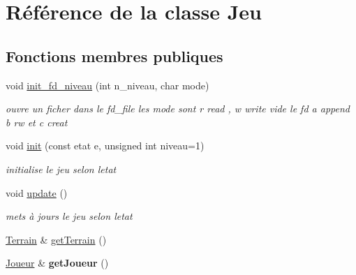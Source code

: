 \hypertarget{class_jeu}{}\section{Référence de la classe Jeu}
\label{class_jeu}
\subsection*{Fonctions membres publiques}
\begin{DoxyCompactItemize}
\item 
\mbox{\label{class_jeu_a5535a6630eb92c048a10ef791e71cf5a}} 
void \mbox{\hyperlink{class_jeu_a5535a6630eb92c048a10ef791e71cf5a}{init\+\_\+fd\+\_\+niveau}} (int n\+\_\+niveau, char mode)
\begin{DoxyCompactList}\small\item\em ouvre un ficher dans le fd\+\_\+file les mode sont \textquotesingle{}r\textquotesingle{} read , \textquotesingle{}w\textquotesingle{} write vide le fd \textquotesingle{}a\textquotesingle{} append \textquotesingle{}b\textquotesingle{} rw et \textquotesingle{}c\textquotesingle{} creat \end{DoxyCompactList}\item 
\mbox{\label{class_jeu_a788037897f6abc1faec97f000e9695a9}} 
void \mbox{\hyperlink{class_jeu_a788037897f6abc1faec97f000e9695a9}{init}} (const etat e, unsigned int niveau=1)
\begin{DoxyCompactList}\small\item\em initialise le jeu selon l\textquotesingle{}etat \end{DoxyCompactList}\item 
\mbox{\label{class_jeu_a6b6b7d4683d04ebab6dd03e82b41a1c3}} 
void \mbox{\hyperlink{class_jeu_a6b6b7d4683d04ebab6dd03e82b41a1c3}{update}} ()
\begin{DoxyCompactList}\small\item\em mets à jours le jeu selon l\textquotesingle{}etat \end{DoxyCompactList}\item 
\mbox{\hyperlink{class_terrain}{Terrain}} \& \mbox{\hyperlink{class_jeu_a4b5b107671761a6bb963475bf4ecc8dd}{get\+Terrain}} ()
\item 
\mbox{\label{class_jeu_adce66fc950c7f86430d4feb20002b3e1}} 
\mbox{\hyperlink{class_joueur}{Joueur}} \& {\bfseries get\+Joueur} ()

\end{DoxyCompactItemize}
